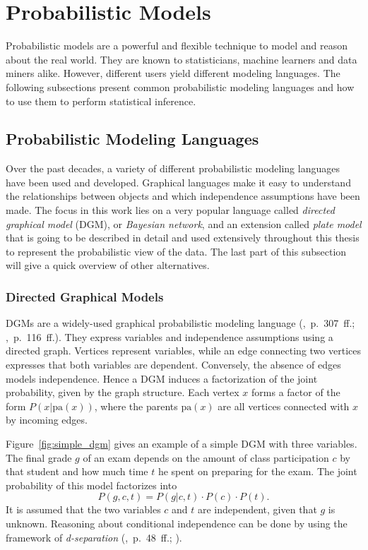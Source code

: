 \section{Probabilistic Models}

Probabilistic models are a powerful and flexible technique to model and reason about the real world. They are known to statisticians, machine learners and data miners alike. However, different users yield different modeling languages. The following subsections present common probabilistic modeling languages and how to use them to perform statistical inference.

\subsection{Probabilistic Modeling Languages}

Over the past decades, a variety of different probabilistic modeling languages have been used and developed. Graphical languages make it easy to understand the relationships between objects and which independence assumptions have been made. The focus in this work lies on a very popular language called \emph{directed graphical model} (DGM), or \emph{Bayesian network}, and an extension called \emph{plate model} that is going to be described in detail and used extensively throughout this thesis to represent the probabilistic view of the data. The last part of this subsection will give a quick overview of other alternatives.

\subsubsection{Directed Graphical Models} %

DGMs are a widely-used graphical probabilistic modeling language (\cite{murphy2012machine},~p.~307~ff.; \cite{pearl1988probabilistic},~p.~116~ff.). They express variables and independence assumptions using a directed graph. Vertices represent variables, while an edge connecting two vertices expresses that both variables are dependent. Conversely, the absence of edges models independence. Hence a DGM induces a factorization of the joint probability, given by the graph structure. Each vertex $x$ forms a factor of the form $P\left(x|\text{pa}(x)\right)$, where the parents $\text{pa}(x)$ are all vertices connected with $x$ by incoming edges.

Figure~\ref{fig:simple_dgm} gives an example of a simple DGM with three variables. The final grade $g$ of an exam depends on the amount of class participation $c$ by that student and how much time $t$ he spent on preparing for the exam. The joint probability of this model factorizes into $$P(g,c,t) = P(g | c, t) \cdot P(c) \cdot P(t).$$ It is assumed that the two variables $c$ and $t$ are independent, given that $g$ is unknown. Reasoning about conditional independence can be done by using the framework of \emph{d-separation}  (\cite{lauritzen1996graphical},~p.~48~ff.; \cite{pearl1988probabilistic}).

